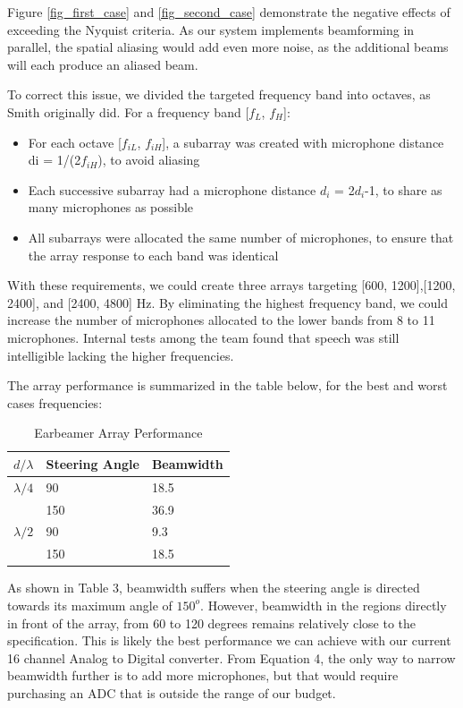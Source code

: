 \documentclass[10pt,journal,compsoc]{IEEEtran}
\begin{document}
Figure \ref{fig_first_case} and \ref{fig_second_case} demonstrate the negative effects of exceeding the Nyquist criteria. As our system implements beamforming in parallel, the spatial aliasing would add even more noise, as the additional beams will each produce an aliased beam.

To correct this issue, we divided the targeted frequency band into octaves, as Smith originally did. For a frequency band [$f_L$, $f_H$]:

\begin{itemize}
\item	For each octave [$f_{iL}$, $f_{iH}$], a subarray was created with microphone distance di = 1/(2$f_{iH}$), to avoid aliasing
\item	Each successive subarray had a microphone distance $d_{i}$ = 2$d_i$-1, to share as many microphones as possible
\item	All subarrays were allocated the same number of microphones, to ensure that the array response to each band was identical
\end{itemize}

With these requirements, we could create three arrays targeting [600, 1200],[1200, 2400], and [2400, 4800] Hz. By eliminating the highest frequency band, we could increase the number of microphones allocated to the lower bands from 8 to 11 microphones. Internal tests among the team found that speech was still intelligible lacking the higher frequencies.

The array performance is summarized in the table below, for the best and worst cases frequencies:

\begin{table}[!h]
    \centering
    \begin{tabular}{|l|l|l|}
        \hline
        $d/\lambda$ & Steering Angle & Beamwidth  \\
        \hline
        $\lambda/4$  & 90 & 18.5\\
                     & 150 & 36.9\\
        $\lambda/2$  & 90 & 9.3\\
                     & 150 & 18.5\\
        \hline
    \end{tabular}
    \caption{Earbeamer Array Performance}
    \label{tab:earbeamer_performance}
\end{table}

As shown in Table 3, beamwidth suffers when the steering angle is directed towards its maximum angle of $150^o$. However, beamwidth in the regions directly in front of the array, from 60 to 120 degrees remains relatively close to the specification. This is likely the best performance we can achieve with our current 16 channel Analog to Digital converter. From Equation 4, the only way to narrow beamwidth further is to add more microphones, but that would require purchasing an ADC that is outside the range of our budget.
\end{document}
